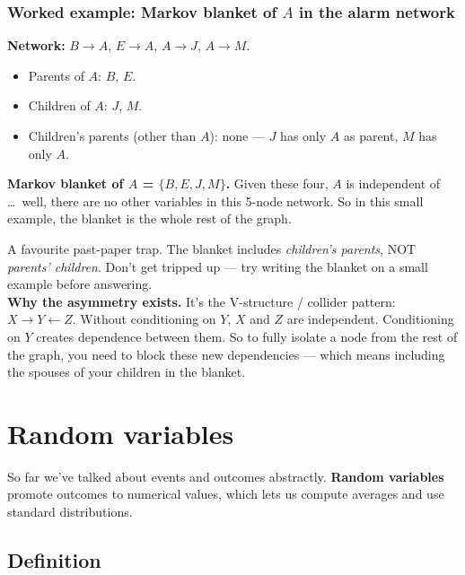 \documentclass[11pt, a4paper]{article}
\begin{document}
\subsubsection*{Worked example: Markov blanket of $A$ in the alarm network}

\begin{exbox}
\textbf{Network:} $B \to A$, $E \to A$, $A \to J$, $A \to M$.\\[0.3em]
\begin{itemize}[itemsep=0pt, topsep=0pt]
  \item Parents of $A$: $B$, $E$.
  \item Children of $A$: $J$, $M$.
  \item Children's parents (other than $A$): none — $J$ has only $A$ as parent, $M$ has only $A$.
\end{itemize}
\textbf{Markov blanket of $A$ = $\{B, E, J, M\}$.} Given these four, $A$ is independent of \dots\ well, there are no other variables in this 5-node network. So in this small example, the blanket is the whole rest of the graph.
\end{exbox}

\begin{trapbox}
A favourite past-paper trap. The blanket includes \emph{children's parents}, NOT \emph{parents' children}. Don't get tripped up — try writing the blanket on a small example before answering.\\[0.3em]
\textbf{Why the asymmetry exists.} It's the V-structure / collider pattern: $X \to Y \leftarrow Z$. Without conditioning on $Y$, $X$ and $Z$ are independent. Conditioning on $Y$ creates dependence between them. So to fully isolate a node from the rest of the graph, you need to block these new dependencies — which means including the spouses of your children in the blanket.
\end{trapbox}

\section{Random variables}

So far we've talked about events and outcomes abstractly. \textbf{Random variables} promote outcomes to numerical values, which lets us compute averages and use standard distributions.

\subsection{Definition}
\end{document}
